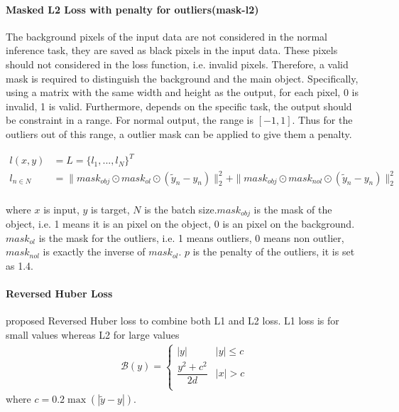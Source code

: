 \documentclass[border=15pt, multi, tikz]{article}
\begin{document}
\paragraph{Masked L2 Loss with penalty for outliers(mask-l2)}
\label{par:maskl2}
The background pixels of the input data are not considered in the normal inference task, they are saved as black pixels in the input data. These pixels should not considered in the loss function, i.e. invalid pixels. Therefore, a valid mask is required to distinguish the background and the main object. Specifically, using a matrix with the same width and height as the output, for each pixel, 0 is invalid, 1 is valid. 
Furthermore, depends on the specific task, the output should be constraint in a range. For normal output, the range is $ [-1,1] $. Thus for the outliers out of this range, a outlier mask can be applied to give them a penalty.

\begin{equation}\label{gcnn-loss}
	\begin{array}{ll}
		l(x,y)&= L  = \{l_1, ..., l_N\}^T\\ 
		l_{n\in N} &= \| mask_{obj} \odot mask_{ol} \odot ( {\tilde y}_n - y_n) \|_2^2 + 	\| mask_{obj} \odot mask_{nol} \odot ( {\tilde y}_n - y_n) \|_2^2 \\
	\end{array}
\end{equation}

where $ x $ is input, $ y $ is target, $ N $ is the batch size.$ mask_{obj} $ is the mask of the object, i.e. 1 means it is an pixel on the object, 0 is an pixel on the background. $ mask_{ol} $ is the mask for the outliers, i.e. 1 means outliers, 0 means non outlier, $ mask_{nol} $ is exactly the inverse of $ mask_{ol} $. $ p $ is the penalty of the outliers, it is set as 1.4.


\paragraph{Reversed Huber Loss}

\cite{berhu-loss} proposed Reversed Huber loss to combine both L1 and L2 loss. L1 loss is for small values whereas L2 for large values
\begin{equation}\label{berhu-loss}
	\begin{array}{ll}
		\mathcal{B}(y)= \begin{cases}
			|y| & |y| \le c \\
			\dfrac{y^2 + c^2}{2d} & |x| > c\\
		\end{cases}
	\end{array}
\end{equation}
where $ c=0.2\max (|\tilde y - y|) $.
\end{document}
